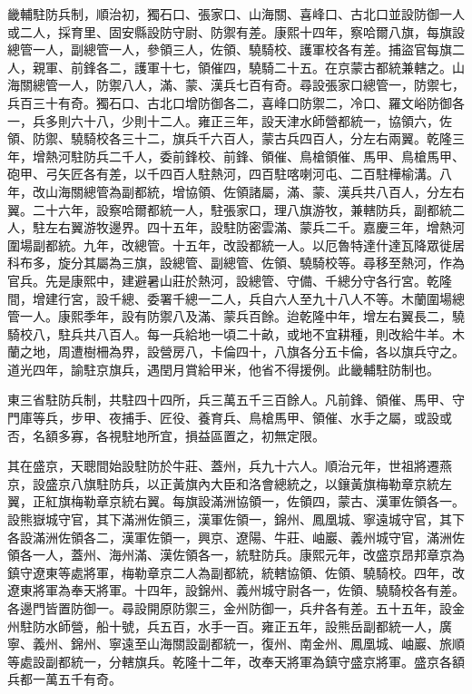 \begin{pinyinscope}
畿輔駐防兵制，順治初，獨石口、張家口、山海關、喜峰口、古北口並設防御一人或二人，採育里、固安縣設防守尉、防禦有差。康熙十四年，察哈爾八旗，每旗設總管一人，副總管一人，參領三人，佐領、驍騎校、護軍校各有差。捕盜官每旗二人，親軍、前鋒各二，護軍十七，領催四，驍騎二十五。在京蒙古都統兼轄之。山海關總管一人，防禦八人，滿、蒙、漢兵七百有奇。尋設張家口總管一，防禦七，兵百三十有奇。獨石口、古北口增防御各二，喜峰口防禦二，冷口、羅文峪防御各一，兵多則六十八，少則十二人。雍正三年，設天津水師營都統一，協領六，佐領、防禦、驍騎校各三十二，旗兵千六百人，蒙古兵四百人，分左右兩翼。乾隆三年，增熱河駐防兵二千人，委前鋒校、前鋒、領催、鳥槍領催、馬甲、鳥槍馬甲、砲甲、弓矢匠各有差，以千四百人駐熱河，四百駐喀喇河屯、二百駐樺榆溝。八年，改山海關總管為副都統，增協領、佐領諸屬，滿、蒙、漢兵共八百人，分左右翼。二十六年，設察哈爾都統一人，駐張家口，理八旗游牧，兼轄防兵，副都統二人，駐左右翼游牧邊界。四十五年，設駐防密雲滿、蒙兵二千。嘉慶三年，增熱河圍場副都統。九年，改總管。十五年，改設都統一人。以厄魯特達什達瓦降眾徙居科布多，旋分其屬為三旗，設總管、副總管、佐領、驍騎校等。尋移至熱河，作為官兵。先是康熙中，建避暑山莊於熱河，設總管、守備、千總分守各行宮。乾隆間，增建行宮，設千總、委署千總一二人，兵自六人至九十八人不等。木蘭圍場總管一人。康熙季年，設有防禦八及滿、蒙兵百餘。迨乾隆中年，增左右翼長二，驍騎校八，駐兵共八百人。每一兵給地一頃二十畝，或地不宜耕種，則改給牛羊。木蘭之地，周遭樹柵為界，設營房八，卡倫四十，八旗各分五卡倫，各以旗兵守之。道光四年，諭駐京旗兵，遇閏月賞給甲米，他省不得援例。此畿輔駐防制也。

東三省駐防兵制，共駐四十四所，兵三萬五千三百餘人。凡前鋒、領催、馬甲、守門庫等兵，步甲、夜捕手、匠役、養育兵、鳥槍馬甲、領催、水手之屬，或設或否，名額多寡，各視駐地所宜，損益區置之，初無定限。

其在盛京，天聰間始設駐防於牛莊、蓋州，兵九十六人。順治元年，世祖將遷燕京，設盛京八旗駐防兵，以正黃旗內大臣和洛會總統之，以鑲黃旗梅勒章京統左翼，正紅旗梅勒章京統右翼。每旗設滿洲協領一，佐領四，蒙古、漢軍佐領各一。設熊嶽城守官，其下滿洲佐領三，漢軍佐領一，錦州、鳳凰城、寧遠城守官，其下各設滿洲佐領各二，漢軍佐領一，興京、遼陽、牛莊、岫巖、義州城守官，滿洲佐領各一人，蓋州、海州滿、漢佐領各一，統駐防兵。康熙元年，改盛京昂邦章京為鎮守遼東等處將軍，梅勒章京二人為副都統，統轄協領、佐領、驍騎校。四年，改遼東將軍為奉天將軍。十四年，設錦州、義州城守尉各一，佐領、驍騎校各有差。各邊門皆置防御一。尋設開原防禦三，金州防御一，兵弁各有差。五十五年，設金州駐防水師營，船十號，兵五百，水手一百。雍正五年，設熊岳副都統一人，廣寧、義州、錦州、寧遠至山海關設副都統一，復州、南金州、鳳凰城、岫巖、旅順等處設副都統一，分轄旗兵。乾隆十二年，改奉天將軍為鎮守盛京將軍。盛京各額兵都一萬五千有奇。


\end{pinyinscope}
